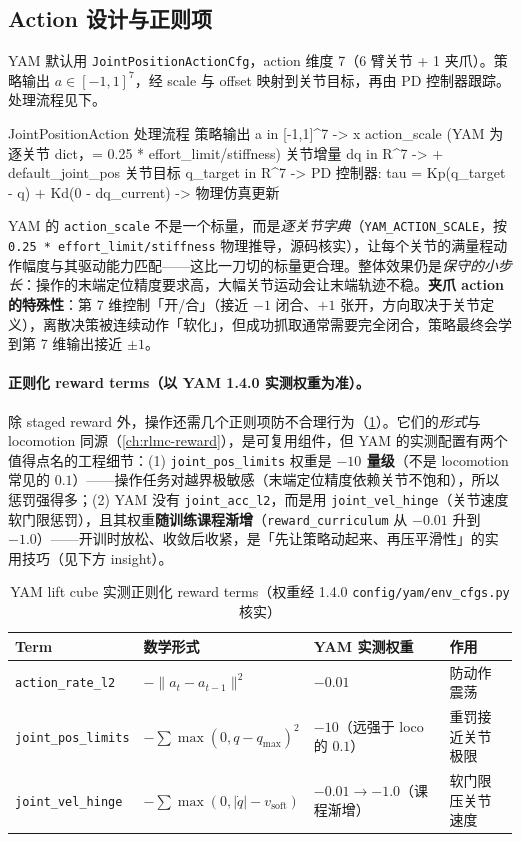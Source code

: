 \subsection{Action 设计与正则项}
\label{sec:rlmc-manip-act}

YAM 默认用 \verb|JointPositionActionCfg|，action 维度 7（6 臂关节 + 1 夹爪）。策略输出 $a\in[-1,1]^7$，经 scale 与 offset 映射到关节目标，再由 PD 控制器跟踪。处理流程见下。

\begin{codebox}[text]{JointPositionAction 处理流程}
策略输出 a in [-1,1]^7
    -> x action_scale (YAM 为逐关节 dict，= 0.25 * effort_limit/stiffness)
关节增量 dq in R^7
    -> + default_joint_pos
关节目标 q_target in R^7
    -> PD 控制器: tau = Kp(q_target - q) + Kd(0 - dq_current)
    -> 物理仿真更新
\end{codebox}

YAM 的 \verb|action_scale| 不是一个标量，而是\emph{逐关节字典}（\verb|YAM_ACTION_SCALE|，按 \verb|0.25 * effort_limit/stiffness| 物理推导，源码核实），让每个关节的满量程动作幅度与其驱动能力匹配——这比一刀切的标量更合理。整体效果仍是\emph{保守的小步长}：操作的末端定位精度要求高，大幅关节运动会让末端轨迹不稳。\textbf{夹爪 action 的特殊性}：第 7 维控制「开/合」（接近 $-1$ 闭合、$+1$ 张开，方向取决于关节定义），离散决策被连续动作「软化」，但成功抓取通常需要完全闭合，策略最终会学到第 7 维输出接近 $\pm1$。

\paragraph{正则化 reward terms（以 YAM 1.4.0 实测权重为准）。}除 staged reward 外，操作还需几个正则项防不合理行为（\cref{tab:rlmc-manip-reg}）。它们的\emph{形式}与 locomotion 同源（\cref{ch:rlmc-reward}），是可复用组件，但 YAM 的实测配置有两个值得点名的工程细节：(1) \verb|joint_pos_limits| 权重是 \textbf{$-10$ 量级}（不是 locomotion 常见的 $0.1$）——操作任务对越界极敏感（末端定位精度依赖关节不饱和），所以惩罚强得多；(2) YAM 没有 \verb|joint_acc_l2|，而是用 \verb|joint_vel_hinge|（关节速度软门限惩罚），且其权重\textbf{随训练课程渐增}（\verb|reward_curriculum| 从 $-0.01$ 升到 $-1.0$）——开训时放松、收敛后收紧，是「先让策略动起来、再压平滑性」的实用技巧（见下方 insight）。

\begin{table}[ht]
\centering
\small
\caption{YAM lift cube 实测正则化 reward terms（权重经 1.4.0 \texttt{config/yam/env\_cfgs.py} 核实）}
\label{tab:rlmc-manip-reg}
\begin{tabular}{@{}llll@{}}
\toprule
Term & 数学形式 & YAM 实测权重 & 作用 \\
\midrule
\verb|action_rate_l2| & $-\|a_t-a_{t-1}\|^2$ & $-0.01$ & 防动作震荡 \\
\verb|joint_pos_limits| & $-\sum\max(0,q-q_{\max})^2$ & $-10$（远强于 loco 的 $0.1$） & 重罚接近关节极限 \\
\verb|joint_vel_hinge| & $-\sum\max(0,|\dot q|-v_{\text{soft}})$ & $-0.01\to-1.0$（课程渐增） & 软门限压关节速度 \\
\bottomrule
\end{tabular}
\end{table}

